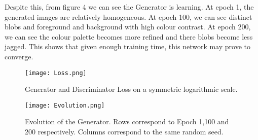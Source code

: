 \documentclass[conference]{IEEEtran}
\begin{document}
Despite this, from figure 4 we can see the Generator is learning. At epoch 1, the generated images are relatively homogeneous. At epoch 100, we can see distinct blobs and foreground and background with high colour contrast. At epoch 200, we can see the colour palette becomes more refined and there blobs become less jagged. This shows that given enough training time, this network may prove to converge.
\begin{figure}[H]
    \centering
    \texttt{[image: Loss.png]}
    \caption{Generator and Discriminator Loss on a symmetric logarithmic scale.}
    
\end{figure}
\begin{figure}[H]
    \centering
    \texttt{[image: Evolution.png]}
    \caption{Evolution of the Generator. Rows correspond to Epoch 1,100 and 200 respectively. Columns correspond to the same random seed.}
    \label{fig:my_label}
\end{figure}


%
%

\end{document}

